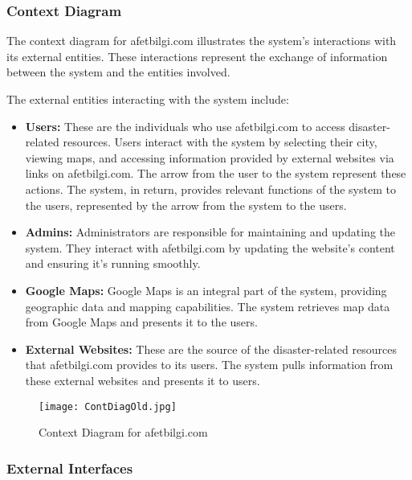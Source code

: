 \documentclass[12pt, letterpaper]{article}
\begin{document}
\newpage

\subsubsection{Context Diagram}
The context diagram for afetbilgi.com illustrates the system's interactions with its external entities. These interactions represent the exchange of information between the system and the entities involved.

The external entities interacting with the system include:
\begin{itemize}
    \item \textbf{Users:} These are the individuals who use afetbilgi.com to access disaster-related resources. Users interact with the system by selecting their city, viewing maps, and accessing information provided by external websites via links on afetbilgi.com. The arrow from the user to the system represent these actions. The system, in return, provides relevant functions of the system to the users, represented by the arrow from the system to the users.

    \item \textbf{Admins:} Administrators are responsible for maintaining and updating the system. They interact with afetbilgi.com by updating the website's content and ensuring it's running smoothly.

    \item \textbf{Google Maps:} Google Maps is an integral part of the system, providing geographic data and mapping capabilities. The system retrieves map data from Google Maps and presents it to the users.

    \item \textbf{External Websites:} These are the source of the disaster-related resources that afetbilgi.com provides to its users. The system pulls information from these external websites and presents it to users.
\end{itemize}

\begin{figure}[H]
\centering
\texttt{[image: ContDiagOld.jpg]}
\caption{Context Diagram for afetbilgi.com}
\end{figure}

\newpage

\subsubsection{External Interfaces}
\end{document}
